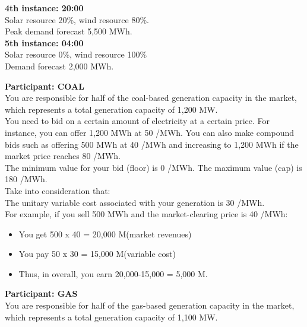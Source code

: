 \documentclass[3p]{elsarticle} %
\begin{document}
\textbf{4th instance: 20:00 } \\
Solar resource 20\%, wind resource 80\%. \\
Peak demand forecast 5,500 MWh. \\

\textbf{5th instance: 04:00} \\
Solar resource 0\%, wind resource 100\% \\
Demand forecast 2,000 MWh. \\

\newpage

\textbf{Participant: COAL} \\

You are responsible for half of the coal-based generation capacity in the market, which represents a total generation capacity of 1,200 MW. \\

You need to bid on a certain amount of electricity at a certain price. For instance, you can offer 1,200 MWh at 50 \EUR/MWh. You can also make compound bids such as offering 500 MWh at 40 \EUR/MWh and increasing to 1,200 MWh if the market price reaches 80 \EUR/MWh. \\

The minimum value for your bid (floor) is 0 \EUR/MWh. The maximum value (cap) is 180 \EUR/MWh. \\

Take into consideration that: \\

The unitary variable cost associated with your generation is 30 \EUR/MWh. \\

For example, if you sell 500 MWh and the market-clearing price is 40 \EUR/MWh:
\begin{itemize}
\item You get 500 x 40 = 20,000 M\EUR (market revenues)
\item You pay 50 x 30 = 15,000 M\EUR (variable cost)
\item Thus, in overall, you earn 20,000-15,000 = 5,000 M\EUR.
\end{itemize}

\newpage


\textbf{Participant: GAS} \\

You are responsible for half of the gas-based generation capacity in the market, which represents a total generation capacity of 1,100 MW. \\
\end{document}
